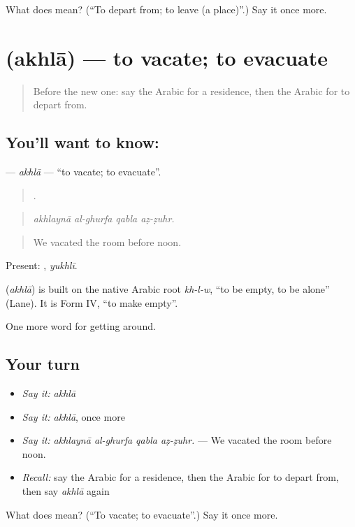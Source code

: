\begin{tcolorbox}[breakable,colback=teal!4,colframe=teal!35!black,title={Before you move on}]
What does  mean? (\textquotedblleft{}To depart from; to leave (a place)\textquotedblright{}.) Say it once more.
\end{tcolorbox}
\section[\texorpdfstring{\ar{أخلى} (akhlā)}{أخلى (akhlā)}]{ (akhlā) — to vacate; to evacuate}

\label{lesson:AR-C441-akhla}



\begin{quote}
Before the new one: say the Arabic for a residence, then the Arabic for to depart from.
\end{quote}

\subsection*{You'll want to know: }
\textbf{} — \emph{akhlā} — \textquotedblleft{}to vacate; to evacuate\textquotedblright{}.

\begin{quote}
   .
\end{quote}

\begin{quote}
\emph{akhlaynā al-ghurfa qabla aẓ-ẓuhr.}
\end{quote}

\begin{quote}
We vacated the room before noon.
\end{quote}

Present: , \emph{yukhlī}.

\begin{cousinweb}
\textbf{} (\emph{akhlā}) is built on the native Arabic root \emph{kh-l-w}, \textquotedblleft{}to be empty, to be alone\textquotedblright{} (Lane). It is Form IV, \textquotedblleft{}to make empty\textquotedblright{}.
\end{cousinweb}

\begin{grammarlens}[title={What you've built}]
One more word for getting around.
\end{grammarlens}

\subsection*{Your turn}
\begin{itemize}
\raggedright
  \item \emph{Say it:} \emph{akhlā}
  \item \emph{Say it:} \emph{akhlā}, once more
  \item \emph{Say it:} \emph{akhlaynā al-ghurfa qabla aẓ-ẓuhr.} — We vacated the room before noon.
  \item \emph{Recall:} say the Arabic for a residence, then the Arabic for to depart from, then say \emph{akhlā} again
\end{itemize}

\begin{tcolorbox}[breakable,colback=teal!4,colframe=teal!35!black,title={Before you move on}]
What does  mean? (\textquotedblleft{}To vacate; to evacuate\textquotedblright{}.) Say it once more.
\end{tcolorbox}
